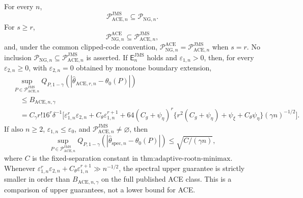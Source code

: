 For every \(n\),
\[
 \mathcal P_{\mathrm{ACE},n}^{\mathrm{JMS}}
 \subseteq\mathcal P_{\mathrm{NG},n}.
\]
For \(s\ge r\),
\[
 \mathcal P_{\mathrm{NG},n}^{\mathrm{ACE}}
 \subseteq\mathcal P_{\mathrm{ACE},n}^{\mathrm{JMS}},
\]
and, under the common clipped-code convention, \(\mathcal P_{\mathrm{NG},n}^{\mathrm{ACE}}=\mathcal P_{\mathrm{ACE},n}^{\mathrm{JMS}}\) when \(s=r\). No inclusion \(\mathcal P_{\mathrm{NG},n}\subseteq\mathcal P_{\mathrm{ACE},n}^{\mathrm{JMS}}\) is asserted. If \(\mathsf E_n^{\mathrm{JMS}}\) holds and \(\varepsilon_{1,n}>0\), then, for every \(\varepsilon_{2,n}\ge0\), with \(\varepsilon_{2,n}=0\) obtained by monotone boundary extension,
\[
\begin{aligned}
 &\sup_{P\in\mathcal P_{\mathrm{ACE},n}^{\mathrm{JMS}}}
 Q_{P,1-\gamma}(|\widehat\theta_{\mathrm{ACE},r,n}-\theta_0(P)|)\\
 &\quad\le B_{\mathrm{ACE},n,\gamma}\\
 &\quad=C_{\gamma}r!16^r\delta^{-1}
 \Big[\varepsilon_{1,n}^r\varepsilon_{2,n}
 +C_{\theta}\varepsilon_{1,n}^{r+1}
 +64(C_g+\psi_{\eta})^r
 \{r^2(C_g+\psi_{\eta})+\psi_{\xi}+C_{\theta}\psi_{\eta}\}
 (\gamma n)^{-1/2}\Big].
\end{aligned}
\]
If also \(n\ge2\), \(\varepsilon_{1,n}\le\varepsilon_0\), and \(\mathcal P_{\mathrm{ACE},n}^{\mathrm{JMS}}\neq\varnothing\), then
\[
 \sup_{P\in\mathcal P_{\mathrm{ACE},n}^{\mathrm{JMS}}}
 Q_{P,1-\gamma}(|\widehat\theta_{\mathrm{spec},n}-\theta_0(P)|)
 \le\sqrt{C/(\gamma n)},
\]
where \(C\) is the fixed-separation constant in \(\text{thm:adaptive-rootn-minimax}\). Whenever \(\varepsilon_{1,n}^r\varepsilon_{2,n}+C_{\theta}\varepsilon_{1,n}^{r+1}\gg n^{-1/2}\), the spectral upper guarantee is strictly smaller in order than \(B_{\mathrm{ACE},n,\gamma}\) on the full published ACE class. This is a comparison of upper guarantees, not a lower bound for ACE.